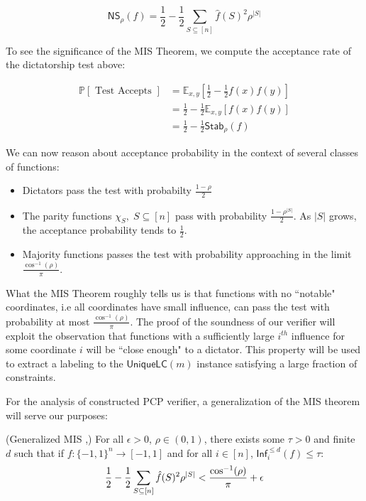 \begin{equation}
  \mathsf{NS}_\rho(f) = \frac{1}{2} - \frac{1}{2}\sum_{S\subseteq [n]}\hat{f}(S)^2\rho^{|S|}
\end{equation}

To see the significance of the MIS Theorem, we compute the acceptance rate of the dictatorship test above:

\begin{align*}
\mathbb{P}\left[ \text{ Test Accepts }\right] & = \mathbb{E}_{x,y}\left[\frac{1}{2} - \frac{1}{2}f(x)f(y) \right] \\
& = \frac{1}{2} - \frac{1}{2}\mathbb{E}_{x,y}\left[f(x)f(y) \right] \\
& = \frac{1}{2} - \frac{1}{2}\mathsf{Stab}_\rho(f)
\end{align*}

We can now reason about acceptance probability in the context of several classes of functions:

\begin{itemize}
  \item Dictators pass the test with probabilty $\frac{1 - \rho}{2}$
  \item The parity functions $\chi_S,\; S \subseteq [n]$ pass with probability $\frac{1 - \rho^{|S|}}{2}$. As $|S|$ grows, the acceptance probability tends to $\frac{1}{2}$.
  \item Majority functions passes the test with probability approaching in the limit $\frac{\cos^{-1}(\rho)}{\pi}$.
\end{itemize}

What the MIS Theorem roughly tells us is that functions with no ``notable" coordinates, i.e all coordinates have small influence, can pass the test with probability at most $\frac{\cos^{-1}(\rho)}{\pi}$. The proof of the soundness of our verifier will exploit the observation that functions with a sufficiently large $i^{th }$ influence for some coordinate $i$ will be ``close enough" to a dictator. This property will be used to extract a labeling to the $\mathsf{UniqueLC}(m)$ instance satisfying a large fraction of constraints.

For the analysis of constructed PCP verifier, a generalization of the MIS theorem will serve our purposes:

\begin{theorem} \label{generalMIS} (Generalized MIS \cite{khot2007optimal},\cite{mossel2005noise})
  For all $\epsilon > 0$, $\rho \in (0,1)$, there exists some $\tau > 0$ and finite $d$ such that if $f:\{-1,1\}^n \rightarrow [-1,1]$ and for all $i \in [n]$, $\mathsf{Inf}^{\leq d}_i(f) \leq \tau$:
  \begin{equation}
    \frac{1}{2} - \frac{1}{2}\sum_{S\subseteq [n]}\hat{f}(S)^2\rho^{|S|} < \frac{\cos^{-1}(\rho)}{\pi} + \epsilon
  \end{equation}
\end{theorem}

